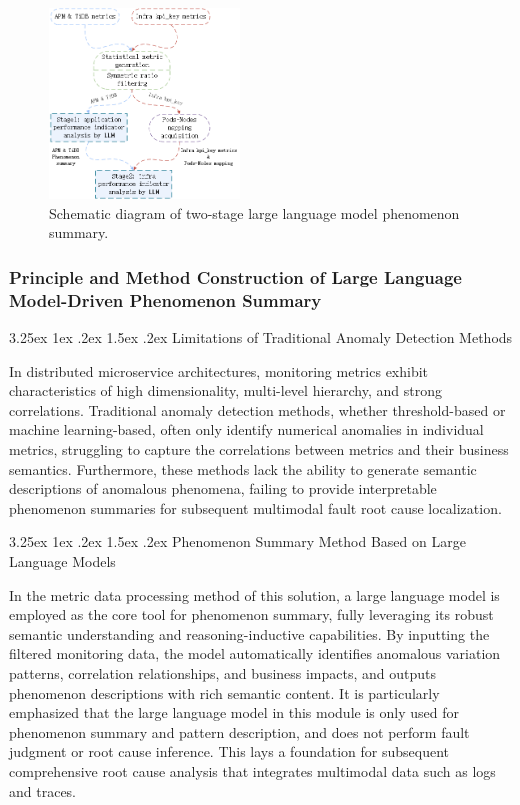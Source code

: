 \documentclass[10pt]{article}
\makeatletter
\renewcommand{\paragraph}{%
    \@startsection{paragraph}{4}{\z@}%
    {3.25ex \@plus1ex \@minus.2ex}%
    {1.5ex \@plus.2ex}%
    {\normalfont\normalsize\itshape}%
}
\makeatother
\begin{document}
\begin{figure}[htbp]
    \centering
    \includegraphics[width=0.45\textwidth]{fig12.png}
    \caption{Schematic diagram of two-stage large language model phenomenon summary.}
    \label{fig12}
\end{figure}

\subsubsection{Principle and Method Construction of Large Language Model-Driven Phenomenon Summary}

\paragraph{Limitations of Traditional Anomaly Detection Methods}

In distributed microservice architectures, monitoring metrics exhibit characteristics of high dimensionality, multi-level hierarchy, and strong correlations. Traditional anomaly detection methods, whether threshold-based or machine learning-based, often only identify numerical anomalies in individual metrics, struggling to capture the correlations between metrics and their business semantics. Furthermore, these methods lack the ability to generate semantic descriptions of anomalous phenomena, failing to provide interpretable phenomenon summaries for subsequent multimodal fault root cause localization.

\paragraph{Phenomenon Summary Method Based on Large Language Models}

In the metric data processing method of this solution, a large language model is employed as the core tool for phenomenon summary, fully leveraging its robust semantic understanding and reasoning-inductive capabilities. By inputting the filtered monitoring data, the model automatically identifies anomalous variation patterns, correlation relationships, and business impacts, and outputs phenomenon descriptions with rich semantic content. It is particularly emphasized that the large language model in this module is only used for phenomenon summary and pattern description, and does not perform fault judgment or root cause inference. This lays a foundation for subsequent comprehensive root cause analysis that integrates multimodal data such as logs and traces.
\end{document}
